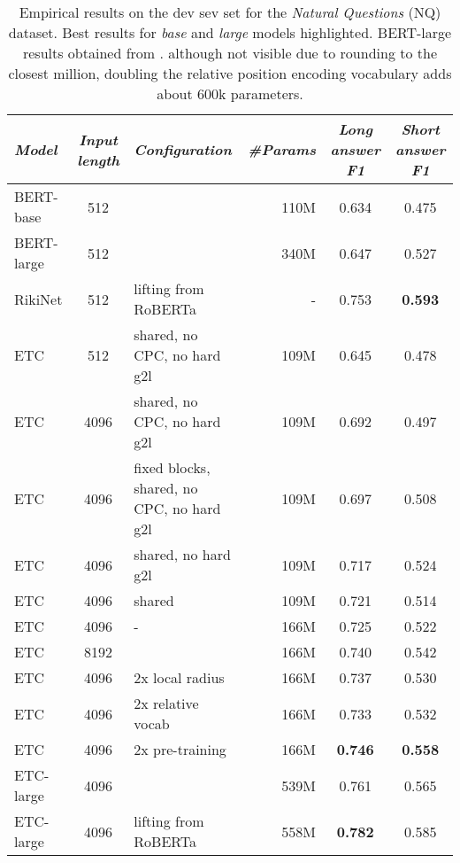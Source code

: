 \documentclass[11pt,a4paper]{article}
\begin{document}
\begin{table*}[tb]\centering 


\begin{small}
\begin{tabular}{lclr|cc} 
{\em Model} & {\em Input length} & {\em Configuration} & {\em \#Params} & {\em Long answer F1} & {\em Short answer F1}  \\ \hline
BERT-base    &   512     &  & 110M                   & 0.634     & 0.475 \\
BERT-large    &   512     & & 340M                     & 0.647     & 0.527 \\
RikiNet & 512       & lifting from RoBERTa & - &  0.753 & {\bf 0.593} \\ 
\hline
ETC	    &   512	    & shared, no CPC, no hard g2l                   & 109M  & 0.645     & 0.478 \\
ETC	    &   4096	    & shared, no CPC, no hard g2l               & 109M      & 0.692	& 0.497 \\
ETC	    &   4096	    & fixed blocks, shared, no CPC, no hard g2l               & 109M      & 0.697	     & 0.508 \\
ETC	    &   4096	    & shared, no hard g2l                 & 109M    & 0.717	     & 0.524 \\
ETC	    &   4096	    & shared                & 109M     & 0.721		     & 0.514 \\
ETC	    &   4096    & -                & 166M     & 0.725		    & 0.522 \\ \hline
ETC	    &   8192    &                  & 166M    & 0.740	    & 0.542 \\
ETC	    &   4096	& 2x local radius    & 166M & 0.737		    & 0.530 \\ 
ETC	    &   4096	& 2x relative vocab   & 166M  & 0.733	    & 0.532 \\ 
ETC	    &   4096	& 2x pre-training     & 166M  & {\bf 0.746}	    & {\bf 0.558} \\ \hline
ETC-large	&   4096	&                & 539M  & 0.761	     & 0.565 \\
ETC-large   &   4096    & lifting from RoBERTa  & 558M & {\bf 0.782}	& 0.585 \\
\end{tabular}	
\end{small}
\caption{Empirical results on the dev sev set for the {\em Natural Questions} (NQ) dataset. Best results for {\em base} and {\em large} models highlighted. BERT-large results obtained from \citet{alberti2019bert}.  although not visible due to rounding to the closest million, doubling the relative position encoding vocabulary adds about 600k parameters.}
\label{tbl:results-nq} 
\end{table*}
\end{document}

